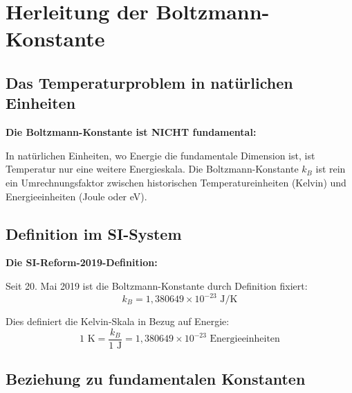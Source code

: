 \documentclass[12pt,a4paper]{article}
\begin{document}
	\section{Herleitung der Boltzmann-Konstante}
	
	\subsection{Das Temperaturproblem in nat{\"u}rlichen Einheiten}
	
	\begin{warning}
		\textbf{Die Boltzmann-Konstante ist NICHT fundamental:}
		
		In nat{\"u}rlichen Einheiten, wo Energie die fundamentale Dimension ist, ist Temperatur nur eine weitere Energieskala. Die Boltzmann-Konstante $k_B$ ist rein ein Umrechnungsfaktor zwischen historischen Temperatureinheiten (Kelvin) und Energieeinheiten (Joule oder eV).
	\end{warning}
	
	\subsection{Definition im SI-System}
	
	\begin{derivation}
		\textbf{Die SI-Reform-2019-Definition:}
		
		Seit 20. Mai 2019 ist die Boltzmann-Konstante durch Definition fixiert:
		\begin{equation}
			\boxed{k_B = 1{,}380649 \times 10^{-23} \text{ J/K}}
			\label{eq:kb_si}
		\end{equation}
		
		Dies definiert die Kelvin-Skala in Bezug auf Energie:
		\begin{equation}
			1 \text{ K} = \frac{k_B}{1 \text{ J}} = 1{,}380649 \times 10^{-23} \text{ Energieeinheiten}
		\end{equation}
	\end{derivation}
	
	\subsection{Beziehung zu fundamentalen Konstanten}
	
\end{document}
